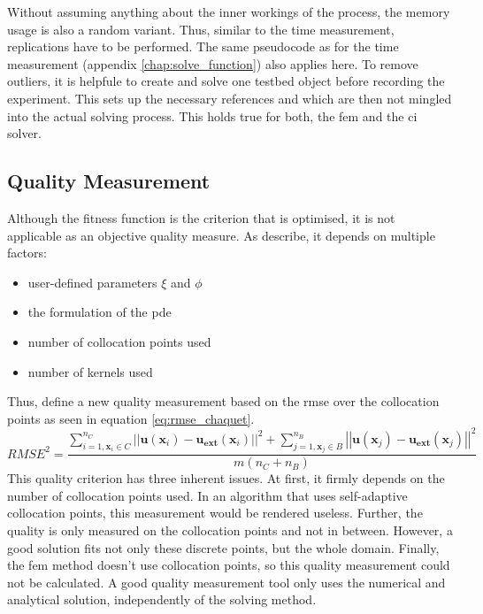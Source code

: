 \documentclass[./\jobname.tex]{subfiles}
\begin{document}
Without assuming anything about the inner workings of the process, the memory usage is also a random variant. Thus, similar to the time measurement, replications have to be performed. The same pseudocode as for the time measurement (appendix \ref{chap:solve_function}) also applies here. To remove outliers, it is helpfule to create and solve one testbed object before recording the experiment. This sets up the necessary references and which are then not mingled into the actual solving process. This holds true for both, the \gls{fem} and the \gls{ci} solver.  

\subsection{Quality Measurement}
\label{chap:metric_quality}
Although the fitness function is the criterion that is optimised, it is not applicable as an objective quality measure. As \cite{chaquet_using_2019} describe, it depends on multiple factors:
\begin{itemize}
	\item user-defined parameters $\xi$ and $\phi$ 
	\item the formulation of the \gls{pde} 
	\item number of collocation points used 
	\item number of kernels used
\end{itemize}
Thus, \cite{chaquet_using_2019} define a new quality measurement based on the \gls{rmse} over the collocation points as seen in equation \ref{eq:rmse_chaquet}. 
\begin{equation}
\label{eq:rmse_chaquet}
RMSE^2 = \frac{\sum_{i=1, \mathbf{x}_i \in C}^{n_C} \left|\left| \mathbf{u}(\mathbf{x}_i) - \mathbf{u_{ext}}(\mathbf{x}_i) \right|\right|^2 + \sum_{j=1, \mathbf{x}_j \in B}^{n_B} \left|\left| \mathbf{u}(\mathbf{x}_j) - \mathbf{u_{ext}}(\mathbf{x}_j) \right|\right|^2}{m(n_C + n_B)}
\end{equation}
This quality criterion has three inherent issues. At first, it firmly depends on the number of collocation points used. In an algorithm that uses self-adaptive collocation points, this measurement would be rendered useless. Further, the quality is only measured on the collocation points and not in between. However, a good solution fits not only these discrete points, but the whole domain. Finally, the \gls{fem} method doesn't use collocation points, so this quality measurement could not be calculated. A good quality measurement tool only uses the numerical and analytical solution, independently of the solving method. 
\end{document}
